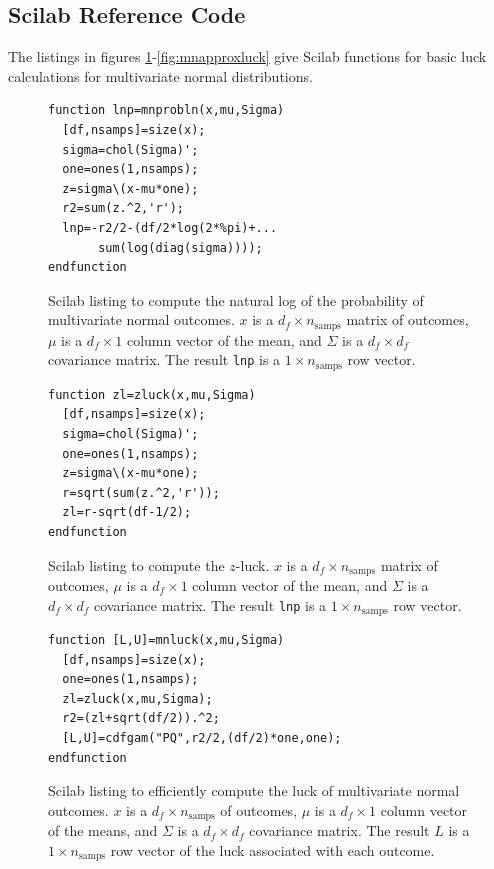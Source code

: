 \subsection{Scilab Reference Code}

The listings in figures \ref{fig:mnprobln}-\ref{fig:mnapproxluck} give Scilab functions for basic luck calculations for multivariate normal distributions.

\begin{figure}
\caption{\label{fig:mnprobln}Scilab listing to compute the natural log of the probability of multivariate normal outcomes.  $x$ is a $d_f \times n_{\text{samps}}$ matrix of outcomes, $\mu$ is a $d_f \times 1$ column vector of the mean, and $\Sigma$ is a $d_f \times d_f$ covariance matrix.  The result {\tt lnp} is a $1 \times n_{\text{samps}}$ row vector.}
\lstset{language=Scilab}
\begin{lstlisting}
function lnp=mnprobln(x,mu,Sigma)
  [df,nsamps]=size(x);
  sigma=chol(Sigma)';
  one=ones(1,nsamps);  
  z=sigma\(x-mu*one);
  r2=sum(z.^2,'r');
  lnp=-r2/2-(df/2*log(2*%pi)+...
       sum(log(diag(sigma))));
endfunction
\end{lstlisting}
\end{figure}

\begin{figure}
\caption{\label{fig:zluck}Scilab listing to compute the $z$-luck.  $x$ is a $d_f \times n_{\text{samps}}$ matrix of outcomes, $\mu$ is a $d_f \times 1$ column vector of the mean, and $\Sigma$ is a $d_f \times d_f$ covariance matrix.  The result {\tt lnp} is a $1 \times n_{\text{samps}}$ row vector.}
\lstset{language=Scilab}
\begin{lstlisting}
function zl=zluck(x,mu,Sigma)
  [df,nsamps]=size(x);
  sigma=chol(Sigma)';
  one=ones(1,nsamps);
  z=sigma\(x-mu*one);
  r=sqrt(sum(z.^2,'r'));
  zl=r-sqrt(df-1/2);
endfunction
\end{lstlisting}
\end{figure}

\begin{figure}
\caption{\label{fig:mnluck}Scilab listing to efficiently compute the luck of multivariate normal outcomes.  $x$ is a $d_f \times n_{\text{samps}}$ of outcomes, $\mu$ is a $d_f \times 1$ column vector of the means, and $\Sigma$ is a $d_f \times d_f$ covariance matrix.  The result $L$ is a $1 \times n_{\text{samps}}$ row vector of the luck associated with each outcome.}
\lstset{language=Scilab}
\begin{lstlisting}
function [L,U]=mnluck(x,mu,Sigma)
  [df,nsamps]=size(x);
  one=ones(1,nsamps);
  zl=zluck(x,mu,Sigma);
  r2=(zl+sqrt(df/2)).^2;
  [L,U]=cdfgam("PQ",r2/2,(df/2)*one,one);
endfunction
\end{lstlisting}
\end{figure}

